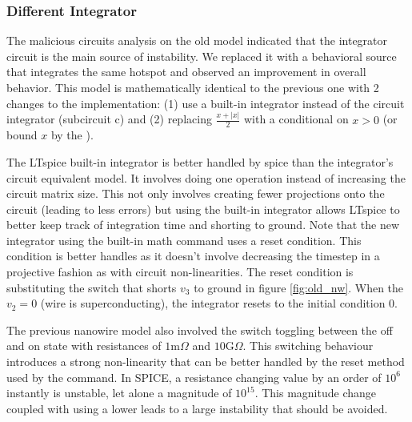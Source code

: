 \subsubsection{Different Integrator}

The malicious circuits analysis on the old model indicated
that the integrator circuit is the main source of instability. 
We replaced it with a behavioral source that integrates the same hotspot
and observed an improvement in overall behavior.
This model is mathematically identical to the previous one with 2 changes
to the implementation: (1) use a built-in integrator instead of the circuit
integrator (subcircuit c) and (2) replacing $\frac{x+|x|}{2}$ with a conditional
on $x>0$ (or bound $x$ by the ).

The LTspice built-in integrator is better handled
by spice than the integrator's circuit equivalent model.
It involves doing one operation instead of increasing the circuit
matrix size. 
This not only involves creating fewer projections onto the circuit (leading to less errors)
but using the built-in integrator allows LTspice to better keep track of integration
time and shorting to ground. Note that the new integrator using the built-in
 math command uses a reset condition. This condition is better handles as it
doesn't involve decreasing the timestep in a projective fashion as with circuit
non-linearities. The reset condition is substituting the switch that shorts $v_3$
to ground in figure \ref{fig:old_nw}. When the $v_2=0$ (wire is superconducting),
the integrator resets to the initial condition $0$.

The previous nanowire model also involved the switch toggling between the off and on
state with resistances of $1$m$\Omega$ and $10$G$\Omega$. This switching behaviour
introduces a strong non-linearity that can be better handled by the reset method
used by the  command. In SPICE, a resistance changing value by an order of
$10^6$ instantly is unstable, let alone a magnitude of $10^{15}$. This magnitude
change coupled with using a lower  leads to a large instability that
should be avoided.

